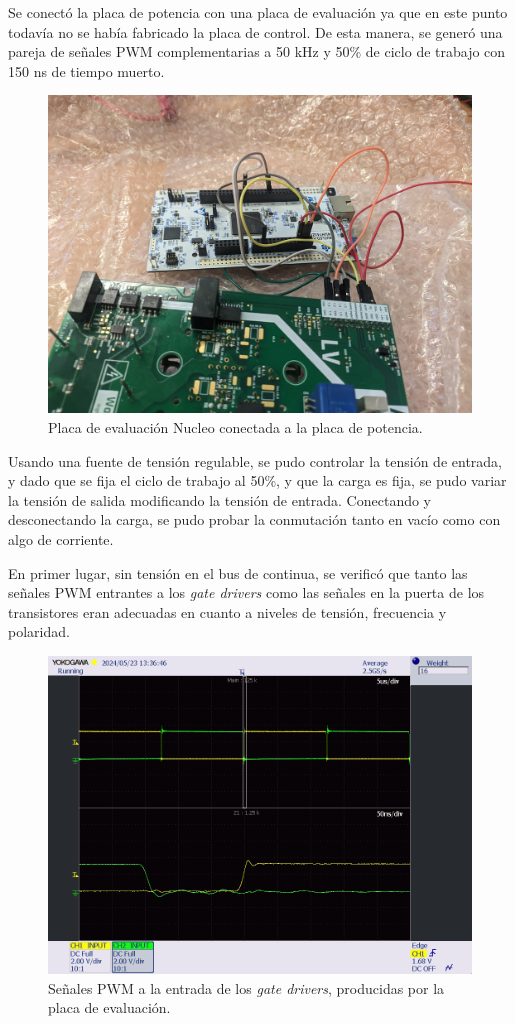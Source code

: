 Se conectó la placa de potencia con una placa de evaluación ya que en este punto todavía no se había fabricado la placa de control. De esta manera, se generó una pareja de señales PWM complementarias a 50 kHz y 50\% de ciclo de trabajo con 150 ns de tiempo muerto. 
	
\begin{figure}[H]
	\centering
	\includegraphics[width=0.7\linewidth]{fig/nucleoHalfBridge}
	\caption{Placa de evaluación Nucleo conectada a la placa de potencia.}
\end{figure}
Usando una fuente de tensión regulable, se pudo controlar la tensión de entrada, y dado que se fija el ciclo de trabajo al 50\%, y que la carga es fija, se pudo variar la tensión de salida modificando la tensión de entrada. Conectando y desconectando la carga, se pudo probar la conmutación tanto en vacío como con algo de corriente.


En primer lugar, sin tensión en el bus de continua, se verificó que tanto las señales PWM entrantes a los \textit{gate drivers} como las señales en la puerta de los transistores eran adecuadas en cuanto a niveles de tensión, frecuencia y polaridad.

	
\begin{figure}[H]
	\centering
	\includegraphics[width=0.7\linewidth]{fig/PWM-HSLS}
	\caption{Señales PWM a la entrada de los \textit{gate drivers}, producidas por la placa de evaluación.}
\end{figure}

